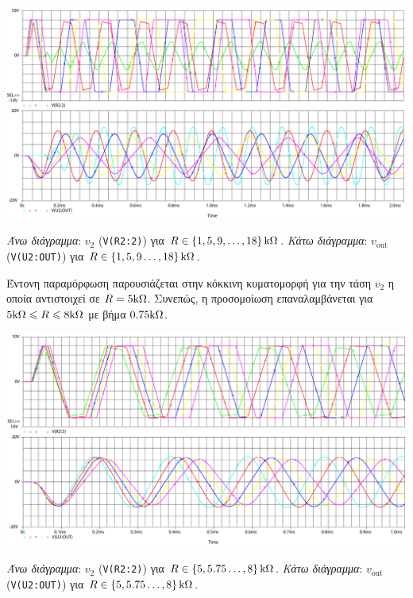 \begin{plot_fig}[H]
	\begin{center}
		\includegraphics[width=15cm]{spice_01/q5_2.pdf}
		\caption{\textsl{Άνω διάγραμμα}: $v_2$ (\texttt{V(R2:2)}) για $R\in\left\{1,5,9,\ldots,18\right\}\kohm$. \textsl{Κάτω διάγραμμα}: $v_{\mathrm{out}}$ (\texttt{V(U2:OUT)}) για $R\in\left\{1,5,9\ldots,18\right\}\kohm$.}
		\label{plot:ask1:q5_2}
	\end{center}
\end{plot_fig}

Έντονη παραμόρφωση παρουσιάζεται στην κόκκινη κυματομορφή για την τάση $v_2$ η οποία αντιστοιχεί σε $R=5\kohm$. Συνεπώς, η προσομοίωση επαναλαμβάνεται για $5\kohm\leqslant R\leqslant 8\kohm$ με βήμα $0.75\kohm$.

\begin{plot_fig}[H]
	\begin{center}
		\includegraphics[width=15cm]{spice_01/q5_3.pdf}
		\caption{\textsl{Άνω διάγραμμα}: $v_2$ (\texttt{V(R2:2)}) για $R\in\left\{5,5.75\ldots,8\right\}\kohm$. \textsl{Κάτω διάγραμμα}: $v_{\mathrm{out}}$ (\texttt{V(U2:OUT)}) για $R\in\left\{5,5.75\ldots,8\right\}\kohm$.}
		\label{plot:ask1:q5_3}
	\end{center}
\end{plot_fig}

